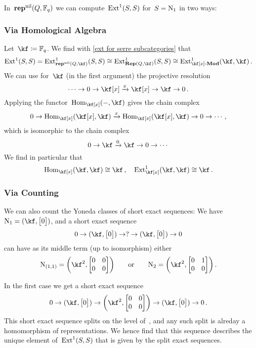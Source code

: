 \documentclass[a4paper,11pt]{scrartcl}
\begin{document}
In~$\mathbf{rep}^{\mathrm{nil}}(Q, \mathbb{F}_q)$ we can compute~$\operatorname{Ext}^1(S,S)$ for~$S = \mathrm{N}_1$ in two ways:

\subsubsection{Via Homological Algebra}

Let~$\kf \defined \Finite_q$.
We find with \cref{ext for serre subcategories} that
\[
  \Ext^1(S,S)
  =
  \Ext^1_{\repnil(Q, \kf)}(S,S)
  \cong
  \Ext^1_{\Rep(Q, \kf)}(S, S)
  \cong
  \Ext^1_{\Mod{\kf[x]}}( \kf, \kf ) \,.
\]
We can use for~$\kf$ (in the first argument) the projective resolution
\[
  \dotsb
  \to
  0
  \to
  \kf[x]
  \xto{x}
  \kf[x]
  \to
  \kf
  \to
  0 \,.
\]
Applying the functor~$\Hom_{\kf[x]}(-, \kf)$ gives the chain complex
\[
  0
  \to
  \Hom_{\kf[x]}( \kf[x], \kf )
  \xto{x}
  \Hom_{\kf[x]}( \kf[x], \kf )
  \to
  0
  \to
  \dotsb \,,
\]
which is isomorphic to the chain complex
\[
  0
  \to
  \kf
  \xto{0}
  \kf
  \to
  0
  \to
  \dotsb
\]
We find in particular that
\[
  \Hom_{\kf[x]}(\kf, \kf) \cong \kf \,,
  \quad
  \Ext^1_{\kf[x]}(\kf, \kf) \cong \kf \,.
\]

\subsubsection{Via Counting}

We can also count the Yoneda classes of short exact sequences:
We have~$\Nil_1 = (\kf, \begin{bmatrix} 0 \end{bmatrix})$, and a short exact sequence
\[
  0
  \to
  (\kf, \begin{bmatrix} 0 \end{bmatrix})
  \to
  ?
  \to
  (\kf, \begin{bmatrix} 0 \end{bmatrix})
  \to
  0
\]
can have as its middle term (up to isomorphism) either
\[
  \Nil_{(1,1)}
  =
  \biggl( \kf^2, \begin{bmatrix} 0 & 0 \\ 0 & 0 \end{bmatrix} \biggr)
  \qquad\text{or}\qquad
  \Nil_2
  =
  \biggl( \kf^2, \begin{bmatrix} 0 & 1 \\ 0 & 0 \end{bmatrix} \biggr) \,.
\]

In the first case we get a short exact sequence
\[
  0
  \to
  (\kf, \begin{bmatrix} 0 \end{bmatrix})
  \to
  \biggl( \kf^2, \begin{bmatrix} 0 & 0 \\ 0 & 0 \end{bmatrix} \biggr)
  \to
  (\kf, \begin{bmatrix} 0 \end{bmatrix})
  \to
  0 \,.
\]
This short exact sequence splits on the level of~\vectorspaces{$\kf$}, and any such split is alreday a homomorphism of representations.
We hence find that this sequence describes the unique element of~$\operatorname{Ext}^1(S,S)$ that is given by the split exact sequences.
\end{document}

